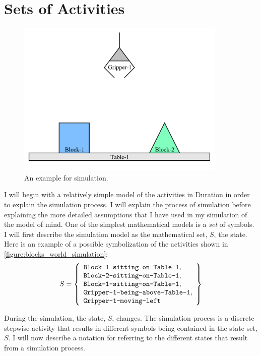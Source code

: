 \section{Sets of Activities}

\begin{figure}[bth]
\includegraphics[width=10cm]{gfx/blocks_world_simulation}
\caption{An example for simulation.}
\label{figure:blocks_world_simulation}
\end{figure}

I will begin with a relatively simple model of the activities in
Duration in order to explain the simulation process.  I will explain
the process of simulation before explaining the more detailed
assumptions that I have used in my simulation of the model of mind.
One of the simplest mathematical models is a \emph{set} of symbols.  I
will first describe the simulation model as the mathematical set, $S$,
the state.  Here is an example of a possible symbolization of the
activities shown in \autoref{figure:blocks_world_simulation}:
\begin{equation}
\label{equation:example_initial_state}
S = \left\{
      \begin{array}{l}
        \text{{\tt Block-1-sitting-on-Table-1}}, \\
        \text{{\tt Block-2-sitting-on-Table-1}}, \\
        \text{{\tt Block-1-sitting-on-Table-1}}, \\
        \text{{\tt Gripper-1-being-above-Table-1}}, \\
        \text{{\tt Gripper-1-moving-left}}
      \end{array}
    \right\}
\end{equation}

During the simulation, the state, $S$, changes.  The simulation
process is a discrete stepwise activity that results in different
symbols being contained in the state set, $S$.  I will now describe a
notation for referring to the different states that result from a
simulation process.

